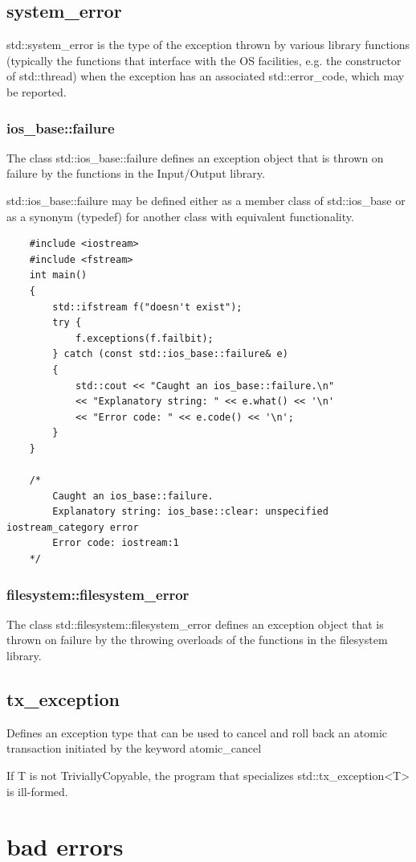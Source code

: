 \documentclass[UTF8,a4paper,12pt]{ctexbook}
\begin{document}
		\subsection{system\_error}
			std::system\_error is the type of the exception thrown by various library functions (typically the functions that interface with the OS facilities, e.g. the constructor of std::thread) when the exception has an associated std::error\_code, which may be reported. 
			\subsubsection{ios\_base::failure}
				The class std::ios\_base::failure defines an exception object that is thrown on failure by the functions in the Input/Output library.
				
				std::ios\_base::failure may be defined either as a member class of std::ios\_base or as a synonym (typedef) for another class with equivalent functionality. 
				
\begin{lstlisting}
	#include <iostream>
	#include <fstream>
	int main()
	{
		std::ifstream f("doesn't exist");
		try {
			f.exceptions(f.failbit);
		} catch (const std::ios_base::failure& e)
		{
			std::cout << "Caught an ios_base::failure.\n"
			<< "Explanatory string: " << e.what() << '\n'
			<< "Error code: " << e.code() << '\n';
		}
	}
					
	/*
		Caught an ios_base::failure.
		Explanatory string: ios_base::clear: unspecified iostream_category error
		Error code: iostream:1
	*/
				\end{lstlisting}
			\subsubsection{filesystem::filesystem\_error}
				The class std::filesystem::filesystem\_error defines an exception object that is thrown on failure by the throwing overloads of the functions in the filesystem library. 
				
		\subsection{tx\_exception}
				Defines an exception type that can be used to cancel and roll back an atomic transaction initiated by the keyword atomic\_cancel
					
				If T is not TriviallyCopyable, the program that specializes std::tx\_exception<T> is ill-formed. 
	\section{bad errors}
\end{document}
